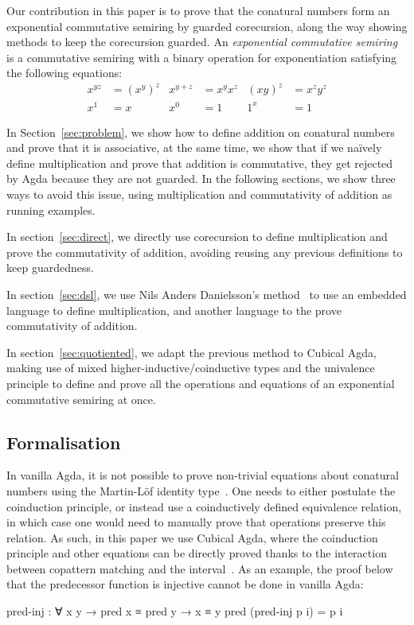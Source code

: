 Our contribution in this paper is to prove that the conatural numbers form an
exponential commutative semiring by guarded corecursion, along the way showing
methods to keep the corecursion guarded. An \emph{exponential commutative
semiring} is a commutative semiring with a binary operation for exponentiation
satisfying the following equations:
\begin{align*}
  x^{yz} &= (x^y)^z & x^{y+z} &= x^y x^z & (xy)^z &= x^z y^z \\
  x^1 &= x & x^0 &= 1 & 1^x &= 1
\end{align*}

In Section~\ref{sec:problem}, we show how to define addition on conatural
numbers and prove that it is associative, at the same time, we show that if we
naïvely define multiplication and prove that addition is commutative, they get
rejected by Agda because they are not guarded. In the following sections, we show
three ways to avoid this issue, using multiplication and commutativity of
addition as running examples.

In section~\ref{sec:direct}, we directly use corecursion to define
multiplication and prove the commutativity of addition, avoiding reusing any
previous definitions to keep guardedness.

In section~\ref{sec:dsl}, we use Nils Anders Danielsson's
method~\cite{danielsson-beating} to use an embedded language to define
multiplication, and another language to the prove commutativity of addition.

In section~\ref{sec:quotiented}, we adapt the previous method to Cubical Agda,
making use of mixed higher-inductive\slash coinductive types and the univalence
principle to define and prove all the operations and equations of an exponential
commutative semiring at once.

\subsection{Formalisation}

In vanilla Agda, it is not possible to prove non-trivial equations about
conatural numbers using the Martin-Löf identity type~\cite{mcbride-unfold}. One
needs to either postulate the coinduction principle, or instead use a
coinductively defined equivalence relation, in which case one would need to
manually prove that operations preserve this relation. As such, in this paper we
use Cubical Agda, where the coinduction principle and other equations can be
directly proved thanks to the interaction between copattern matching and the
interval~\cite{vezzosi-cubical}. As an example, the proof below that the
predecessor function is injective cannot be done in vanilla Agda:
\begin{code}
pred-inj : ∀ {x y} → pred x ≡ pred y → x ≡ y
pred (pred-inj p i) = p i
\end{code}

